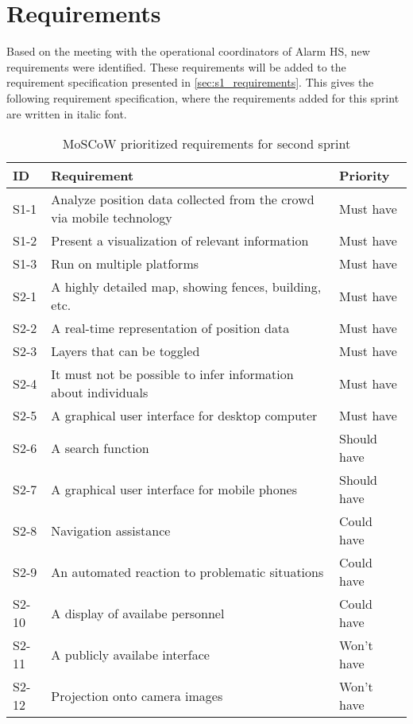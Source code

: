 \section{Requirements} \label{sec:s2_reqs}
Based on the meeting with the operational coordinators of Alarm HS, new requirements were identified. These requirements will be added to the requirement specification presented in \cref{sec:s1_requirements}. This gives the following requirement specification, where the requirements added for this sprint are written in italic font.

\begin{table}[]
	\centering
	\begin{tabularx}{\textwidth}{lXl}
		\toprule
		\textbf{ID} & \textbf{Requirement} & \textbf{Priority} \\
		\toprule 
		
		\rowcolor[HTML]{EFEFEF} 
		S1-1  & Analyze position data collected from the crowd via mobile technology    & Must have \\
		S1-2  & Present a visualization of relevant information                         & Must have \\
		\rowcolor[HTML]{EFEFEF} 
		S1-3  & Run on multiple platforms                                               & Must have \\  
		S2-1  & A highly detailed map, showing fences, building, etc.                   & Must have \\
		\rowcolor[HTML]{EFEFEF} 
		S2-2  & A real-time representation of position data                                & Must have \\
		S2-3  & Layers that can be toggled                                                 & Must have \\
		\rowcolor[HTML]{EFEFEF} 
		S2-4  & It must not be possible to infer information about individuals             & Must have \\ 
		S2-5  & A graphical user interface for desktop computer & Must have \\
		\rowcolor[HTML]{EFEFEF} 
		S2-6  & A search function & Should have \\
		S2-7  & A graphical user interface for mobile phones & Should have \\
		\rowcolor[HTML]{EFEFEF} 
		S2-8  & Navigation assistance & Could have \\ 
		S2-9  & An automated reaction to problematic situations & Could have \\
		\rowcolor[HTML]{EFEFEF} 
		S2-10 & A display of availabe personnel & Could have \\
		S2-11 & A publicly availabe interface & Won't have \\
		\rowcolor[HTML]{EFEFEF} 
		S2-12 & Projection onto camera images & Won't have \\       
		\bottomrule
	\end{tabularx}
	\caption{MoSCoW prioritized requirements for second sprint}
	\label{tab:s2_req}
\end{table}



